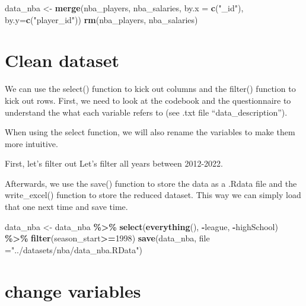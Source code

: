 \documentclass[
]{book}
\newenvironment{Shaded}{\begin{snugshade}}{\end{snugshade}}
\newcommand{\AttributeTok}[1]{\textcolor[rgb]{0.13,0.29,0.53}{#1}}
\newcommand{\DecValTok}[1]{\textcolor[rgb]{0.00,0.00,0.81}{#1}}
\newcommand{\FunctionTok}[1]{\textcolor[rgb]{0.13,0.29,0.53}{\textbf{#1}}}
\newcommand{\NormalTok}[1]{#1}
\newcommand{\OtherTok}[1]{\textcolor[rgb]{0.56,0.35,0.01}{#1}}
\newcommand{\SpecialCharTok}[1]{\textcolor[rgb]{0.81,0.36,0.00}{\textbf{#1}}}
\newcommand{\StringTok}[1]{\textcolor[rgb]{0.31,0.60,0.02}{#1}}
\begin{document}
\begin{Shaded}
\begin{Highlighting}[]
\NormalTok{data\_nba }\OtherTok{\textless{}{-}} \FunctionTok{merge}\NormalTok{(nba\_players, nba\_salaries, }\AttributeTok{by.x =} \FunctionTok{c}\NormalTok{(}\StringTok{"\_id"}\NormalTok{), }\AttributeTok{by.y=}\FunctionTok{c}\NormalTok{(}\StringTok{"player\_id"}\NormalTok{))}
\FunctionTok{rm}\NormalTok{(nba\_players, nba\_salaries)}
\end{Highlighting}
\end{Shaded}

\hypertarget{clean-dataset}{%
\section{Clean dataset}\label{clean-dataset}}

We can use the select() function to kick out columns and the filter() function to kick out rows. First, we need to look at the codebook and the questionnaire to understand the what each variable refers to (see .txt file ``data\_description'').

When using the select function, we will also rename the variables to make them more intuitive.

First, let's filter out Let's filter all years between 2012-2022.

Afterwards, we use the save() function to store the data as a .Rdata file and the write\_excel() function to store the reduced dataset. This way we can simply load that one next time and save time.

\begin{Shaded}
\begin{Highlighting}[]
\NormalTok{data\_nba }\OtherTok{\textless{}{-}}\NormalTok{ data\_nba }\SpecialCharTok{\%\textgreater{}\%}
        \FunctionTok{select}\NormalTok{(}\FunctionTok{everything}\NormalTok{(), }\SpecialCharTok{{-}}\NormalTok{league, }\SpecialCharTok{{-}}\NormalTok{highSchool) }\SpecialCharTok{\%\textgreater{}\%}
        \FunctionTok{filter}\NormalTok{(season\_start}\SpecialCharTok{\textgreater{}=}\DecValTok{1998}\NormalTok{)}
\FunctionTok{save}\NormalTok{(data\_nba, }\AttributeTok{file =}\StringTok{"../datasets/nba/data\_nba.RData"}\NormalTok{)}
\end{Highlighting}
\end{Shaded}

\hypertarget{change-variables}{%
\section{change variables}\label{change-variables}}
\end{document}
